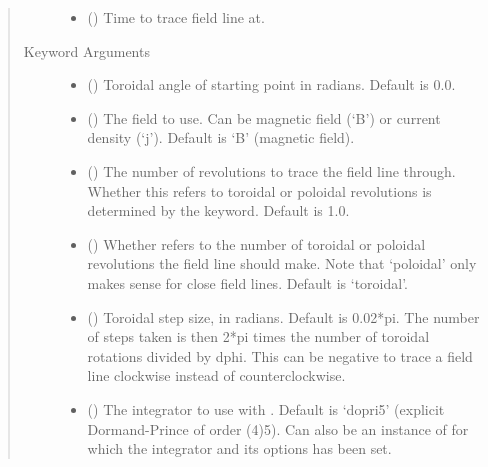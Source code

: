 \documentclass[letterpaper,10pt,english]{sphinxmanual}
\begin{document}
\begin{fulllineitems}
\begin{fulllineitems}
\begin{quote}
\begin{description}
\begin{itemize}
\item {} 
 () \textendash{} Time to trace field line at.

\end{itemize}

\item[{Keyword Arguments}] \leavevmode\begin{itemize}
\item {} 
 () \textendash{} Toroidal angle of starting point in radians. Default
is 0.0.

\item {} 
 (\sphinxstyleliteralemphasis{\sphinxupquote{, }}) \textendash{} The field to use. Can be magnetic field (‘B’) or
current density (‘j’). Default is ‘B’ (magnetic field).

\item {} 
 () \textendash{} The number of revolutions to trace the field line
through. Whether this refers to toroidal or poloidal revolutions
is determined by the  keyword. Default is 1.0.

\item {} 
 (\sphinxstyleliteralemphasis{\sphinxupquote{, }}) \textendash{} Whether  refers to the
number of toroidal or poloidal revolutions the field line should
make. Note that ‘poloidal’ only makes sense for close field
lines. Default is ‘toroidal’.

\item {} 
 () \textendash{} Toroidal step size, in radians. Default is 0.02*pi.
The number of steps taken is then 2*pi times the number of
toroidal rotations divided by dphi. This can be negative to
trace a field line clockwise instead of counterclockwise.

\item {} 
 () \textendash{} The integrator to use with
. Default is ‘dopri5’ (explicit
Dormand-Prince of order (4)5). Can also be an instance of
 for which the integrator and its
options has been set.


\end{itemize}
\end{description}
\end{quote}
\end{fulllineitems}
\end{fulllineitems}
\end{document}
